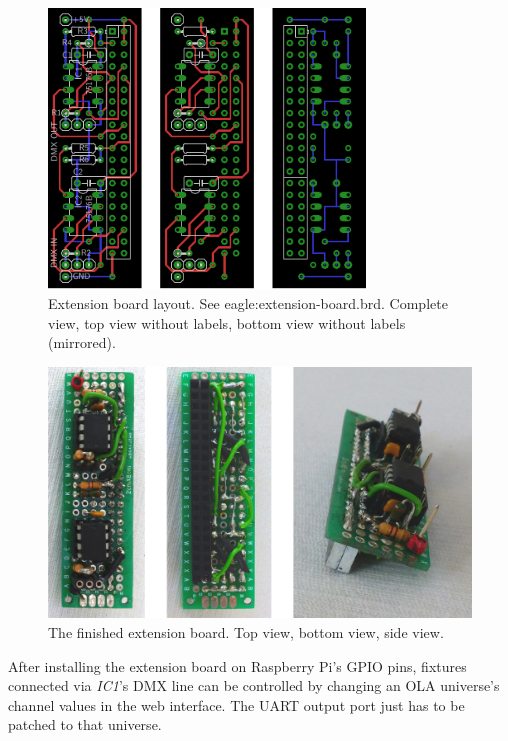 \begin{figure}
\centering
\includegraphics[width=0.75000\textwidth]{Bilder/extension-board-layout.pdf}
\caption[Extension board layout]{Extension board layout. See \gls{eagle:extension-board.brd}.
Complete view, top view without labels, bottom view without labels
(mirrored).}\label{fig:extension-board-layout}
\end{figure}

\vspace{-1.2\baselineskip}

\begin{figure}
\centering
\includegraphics[width=1.00000\textwidth]{Bilder/extension-board-photos.jpg}
\caption[The finished extension board]{The finished extension board. Top view, bottom view, side
view.}\label{fig:extension-board-photos}
\end{figure}

After installing the extension board on Raspberry Pi's GPIO pins,
fixtures connected via \emph{IC1}'s DMX line can be controlled by
changing an OLA universe's channel values in the web interface. The UART
output port just has to be patched to that universe.

